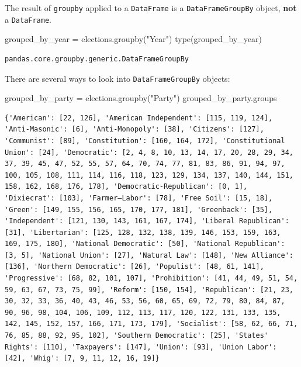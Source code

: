 \documentclass[
  letterpaper,
  DIV=11,
  numbers=noendperiod]{scrreprt}
\newenvironment{Shaded}{\begin{snugshade}}{\end{snugshade}}
\newcommand{\BuiltInTok}[1]{\textcolor[rgb]{0.00,0.23,0.31}{#1}}
\newcommand{\NormalTok}[1]{\textcolor[rgb]{0.00,0.23,0.31}{#1}}
\newcommand{\OperatorTok}[1]{\textcolor[rgb]{0.37,0.37,0.37}{#1}}
\newcommand{\StringTok}[1]{\textcolor[rgb]{0.13,0.47,0.30}{#1}}
\begin{document}
The result of \texttt{groupby} applied to a \texttt{DataFrame} is a
\texttt{DataFrameGroupBy} object, \textbf{not} a \texttt{DataFrame}.

\begin{Shaded}
\begin{Highlighting}[]
\NormalTok{grouped\_by\_year }\OperatorTok{=}\NormalTok{ elections.groupby(}\StringTok{"Year"}\NormalTok{)}
\BuiltInTok{type}\NormalTok{(grouped\_by\_year)}
\end{Highlighting}
\end{Shaded}

\begin{verbatim}
pandas.core.groupby.generic.DataFrameGroupBy
\end{verbatim}

There are several ways to look into \texttt{DataFrameGroupBy} objects:

\begin{Shaded}
\begin{Highlighting}[]
\NormalTok{grouped\_by\_party }\OperatorTok{=}\NormalTok{ elections.groupby(}\StringTok{"Party"}\NormalTok{)}
\NormalTok{grouped\_by\_party.groups}
\end{Highlighting}
\end{Shaded}

\begin{verbatim}
{'American': [22, 126], 'American Independent': [115, 119, 124], 'Anti-Masonic': [6], 'Anti-Monopoly': [38], 'Citizens': [127], 'Communist': [89], 'Constitution': [160, 164, 172], 'Constitutional Union': [24], 'Democratic': [2, 4, 8, 10, 13, 14, 17, 20, 28, 29, 34, 37, 39, 45, 47, 52, 55, 57, 64, 70, 74, 77, 81, 83, 86, 91, 94, 97, 100, 105, 108, 111, 114, 116, 118, 123, 129, 134, 137, 140, 144, 151, 158, 162, 168, 176, 178], 'Democratic-Republican': [0, 1], 'Dixiecrat': [103], 'Farmer–Labor': [78], 'Free Soil': [15, 18], 'Green': [149, 155, 156, 165, 170, 177, 181], 'Greenback': [35], 'Independent': [121, 130, 143, 161, 167, 174], 'Liberal Republican': [31], 'Libertarian': [125, 128, 132, 138, 139, 146, 153, 159, 163, 169, 175, 180], 'National Democratic': [50], 'National Republican': [3, 5], 'National Union': [27], 'Natural Law': [148], 'New Alliance': [136], 'Northern Democratic': [26], 'Populist': [48, 61, 141], 'Progressive': [68, 82, 101, 107], 'Prohibition': [41, 44, 49, 51, 54, 59, 63, 67, 73, 75, 99], 'Reform': [150, 154], 'Republican': [21, 23, 30, 32, 33, 36, 40, 43, 46, 53, 56, 60, 65, 69, 72, 79, 80, 84, 87, 90, 96, 98, 104, 106, 109, 112, 113, 117, 120, 122, 131, 133, 135, 142, 145, 152, 157, 166, 171, 173, 179], 'Socialist': [58, 62, 66, 71, 76, 85, 88, 92, 95, 102], 'Southern Democratic': [25], 'States' Rights': [110], 'Taxpayers': [147], 'Union': [93], 'Union Labor': [42], 'Whig': [7, 9, 11, 12, 16, 19]}
\end{verbatim}
\end{document}

